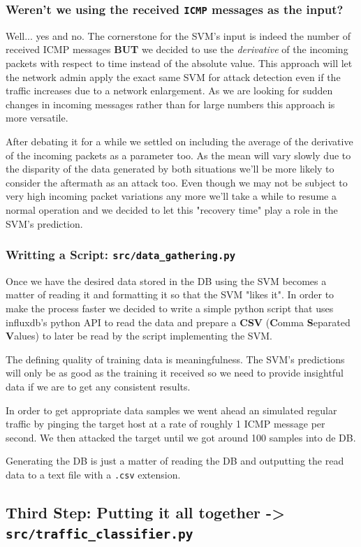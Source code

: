 \documentclass[12pt]{report}
\newcommand{\newpar} {
    \vskip 1cm
}
\begin{document}
\begin{itemize}
{{{{			\subsubsection{Weren't we using the received \texttt{ICMP} messages as the input?}
				Well... yes and no. The cornerstone for the SVM's input is indeed the number of received ICMP messages \textbf{BUT} we decided to use the \textit{derivative} of the incoming packets with respect to time instead of the absolute value. This approach will let the network admin apply the exact same SVM for attack detection even if the traffic increases due to a network enlargement. As we are looking for sudden changes in incoming messages rather than for large numbers this approach is more versatile.
				\newpar
				After debating it for a while we settled on including the average of the derivative of the incoming packets as a parameter too. As the mean will vary slowly due to the disparity of the data generated by both situations we'll be more likely to consider the aftermath as an attack too. Even though we may not be subject to very high incoming packet variations any more we'll take a while to resume a normal operation and we decided to let this "recovery time" play a role in the SVM's prediction.

			\subsubsection{Writting a Script: \texttt{src/data_gathering.py}}
				Once we have the desired data stored in the DB using the SVM becomes a matter of reading it and formatting it so that the SVM "likes it". In order to make the process faster we decided to write a simple python script that uses influxdb's python API to read the data and prepare a \textbf{CSV} (\textbf{C}omma \textbf{S}eparated \textbf{V}alues) to later be read by the script implementing the SVM.
				\newpar
				The defining quality of training data is meaningfulness. The SVM's predictions will only be as good as the training it received so we need to provide insightful data if we are to get any consistent results.
				\newpar
				In order to get appropriate data samples we went ahead an simulated regular traffic by pinging the target host at a rate of roughly 1 ICMP message per second. We then attacked the target until we got around 100 samples into de DB.
				\newpar
				Generating the DB is just a matter of reading the DB and outputting the read data to a text file with a \texttt{.csv} extension.

		\subsection{Third Step: Putting it all together -> \texttt{src/traffic_classifier.py}}
}}}}
\end{itemize}
\end{document}

